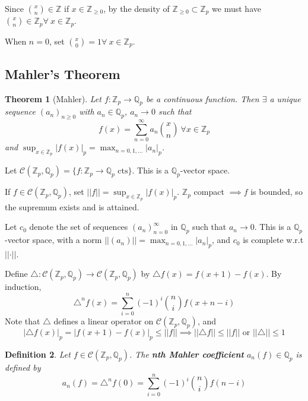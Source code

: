 \documentclass[a4paper]{article}
\newtheorem{definition}{Definition}
\newtheorem{theorem}[definition]{Theorem}
\newcommand*\abs[1]{\left|#1\right|}
\newcommand*\norm[1]{\abs{\abs{#1}}}
\begin{document}
Since ${x \choose n} \in \mathbb{Z}$ if $x \in \mathbb{Z}_{\geq 0}$,
by the density of $\mathbb{Z}_{\geq 0} \subset \mathbb{Z}_p$ we must have ${x \choose n} \in \mathbb{Z}_p \forall\ x \in \mathbb{Z}_p$.

When $n=0$,
set ${x \choose 0}=1 \forall\ x \in \mathbb{Z}_p$.

\subsection{Mahler's Theorem}
\begin{theorem}[Mahler]
	Let $f: \mathbb{Z}_p \to \mathbb{Q}_p$ be a continuous function.
	Then $\exists$ a unique sequence $(a_n)_{n\geq 0}$ with $a_n \in \mathbb{Q}_p$, $a_n \to 0$ such that
	$$f(x) = \sum_{n=0}^{\infty} a_n {x \choose n}\ \forall x \in \mathbb{Z}_p$$
	and $\sup_{x \in \mathbb{Z}_p}\abs{f(x)}_p = \max_{n=0,1,\dots}\abs{a_n}_p$.
\end{theorem}

Let $\mathcal{C}(\mathbb{Z}_p, \mathbb{Q}_p) = \{f: \mathbb{Z}_p \to \mathbb{Q}_p \text{ cts}\}$.
This is a $\mathbb{Q}_p$-vector space.

If $f \in \mathcal{C}(\mathbb{Z}_p, \mathbb{Q}_p)$, set $\norm{f} = \sup_{x \in \mathbb{Z}_p}\abs{f(x)}_p$.
$\mathbb{Z}_p$ compact $\implies f$ is bounded,
so the supremum exists and is attained.

Let $c_0$ denote the set of sequences $(a_n)_{n=0}^\infty$ in $\mathbb{Q}_p$ such that $a_n \to 0$.
This is a $\mathbb{Q}_p$-vector space, with a norm $\norm{(a_n)} = \max_{n=0,1,\dots}\abs{a_n}_p$,
and $c_0$ is complete w.r.t $\norm{\cdot}$.

Define $\triangle: \mathcal{C}(\mathbb{Z}_p, \mathbb{Q}_p) \to \mathcal{C}(\mathbb{Z}_p, \mathbb{Q}_p)$ by $\triangle f(x) = f(x+1) - f(x)$.
By induction,
$$\triangle^n f(x) = \sum_{i=0}^n (-1)^i {n \choose i} f(x+n-i)$$
Note that $\triangle$ defines a linear operator on $\mathcal{C}(\mathbb{Z}_p, \mathbb{Q}_p)$, and
$$\abs{\triangle f(x)}_p = \abs{f(x+1) - f(x)}_p \leq \norm{f} \implies \norm{\triangle f} \leq \norm{f} \text{ or } \norm{\triangle} \leq 1$$

\begin{definition}
	Let $f \in \mathcal{C}(\mathbb{Z}_p, \mathbb{Q}_p)$.
	The \textbf{nth Mahler coefficient} $a_n(f) \in \mathbb{Q}_p$ is defined by
	$$a_n(f) = \triangle^n f(0) = \sum_{i=0}^n (-1)^i {n \choose i} f(n-i)$$
\end{definition}
\end{document}

